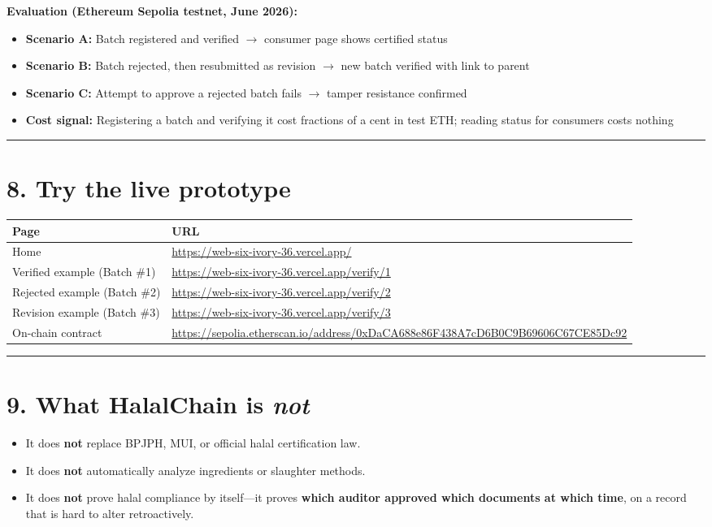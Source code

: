 \documentclass[11pt,a4paper]{article}
\newcommand{\sectionline}{\vspace{0.3em}\noindent\rule{\textwidth}{0.6pt}\vspace{0.6em}}
\begin{document}
\textbf{Evaluation (Ethereum Sepolia testnet, June 2026):}
\begin{itemize}[leftmargin=1.4em, itemsep=0.2em]
  \item \textbf{Scenario A:} Batch registered and verified $\rightarrow$ consumer page shows certified status
  \item \textbf{Scenario B:} Batch rejected, then resubmitted as revision $\rightarrow$ new batch verified with link to parent
  \item \textbf{Scenario C:} Attempt to approve a rejected batch fails $\rightarrow$ tamper resistance confirmed
  \item \textbf{Cost signal:} Registering a batch and verifying it cost fractions of a cent in test ETH; reading status for consumers costs nothing
\end{itemize}

\sectionline

\section*{8. Try the live prototype}

\begin{tabularx}{\textwidth}{@{}lX@{}}
\toprule
\textbf{Page} & \textbf{URL} \\
\midrule
Home & \url{https://web-six-ivory-36.vercel.app/} \\
Verified example (Batch \#1) & \url{https://web-six-ivory-36.vercel.app/verify/1} \\
Rejected example (Batch \#2) & \url{https://web-six-ivory-36.vercel.app/verify/2} \\
Revision example (Batch \#3) & \url{https://web-six-ivory-36.vercel.app/verify/3} \\
On-chain contract & \url{https://sepolia.etherscan.io/address/0xDaCA688e86F438A7cD6B0C9B69606C67CE85Dc92} \\
\bottomrule
\end{tabularx}

\sectionline

\section*{9. What HalalChain is \emph{not}}

\begin{itemize}[leftmargin=1.4em, itemsep=0.25em]
  \item It does \textbf{not} replace BPJPH, MUI, or official halal certification law.
  \item It does \textbf{not} automatically analyze ingredients or slaughter methods.
  \item It does \textbf{not} prove halal compliance by itself---it proves \textbf{which auditor approved which documents at which time}, on a record that is hard to alter retroactively.
\end{itemize}
\end{document}
